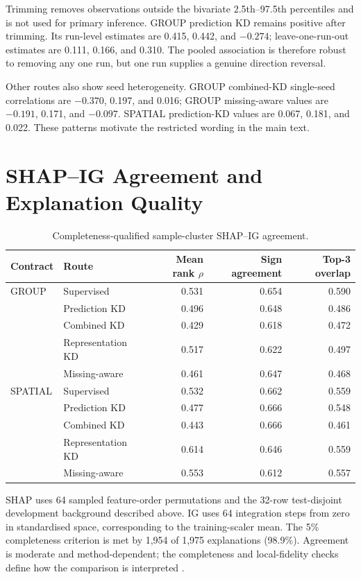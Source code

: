 \documentclass[runningheads]{venue/lncs/llncs}
\begin{document}
Trimming removes observations outside the bivariate 2.5th--97.5th percentiles and is not used for primary inference. GROUP prediction KD remains positive after trimming. Its run-level estimates are 0.415, 0.442, and $-0.274$; leave-one-run-out estimates are 0.111, 0.166, and 0.310. The pooled association is therefore robust to removing any one run, but one run supplies a genuine direction reversal.

Other routes also show seed heterogeneity. GROUP combined-KD single-seed correlations are $-0.370$, 0.197, and 0.016; GROUP missing-aware values are $-0.191$, 0.171, and $-0.097$. SPATIAL prediction-KD values are 0.067, 0.181, and 0.022. These patterns motivate the restricted wording in the main text.

\section{SHAP--IG Agreement and Explanation Quality}

\begin{table}[h]
\centering
\caption{Completeness-qualified sample-cluster SHAP--IG agreement.}
\small
\begin{tabular}{llrrr}
\toprule
Contract & Route & Mean rank $\rho$ & Sign agreement & Top-3 overlap\\
\midrule
GROUP & Supervised & 0.531 & 0.654 & 0.590\\
& Prediction KD & 0.496 & 0.648 & 0.486\\
& Combined KD & 0.429 & 0.618 & 0.472\\
& Representation KD & 0.517 & 0.622 & 0.497\\
& Missing-aware & 0.461 & 0.647 & 0.468\\
\midrule
SPATIAL & Supervised & 0.532 & 0.662 & 0.559\\
& Prediction KD & 0.477 & 0.666 & 0.548\\
& Combined KD & 0.443 & 0.666 & 0.461\\
& Representation KD & 0.614 & 0.646 & 0.559\\
& Missing-aware & 0.553 & 0.612 & 0.557\\
\bottomrule
\end{tabular}
\end{table}

SHAP uses 64 sampled feature-order permutations and the 32-row test-disjoint development background described above. IG uses 64 integration steps from zero in standardised space, corresponding to the training-scaler mean. The 5\% completeness criterion is met by 1,954 of 1,975 explanations (98.9\%). Agreement is moderate and method-dependent; the completeness and local-fidelity checks define how the comparison is interpreted \cite{Hooker2019ROAR,Lundberg2017SHAP,Sundararajan2017IntegratedGradients}.
\end{document}
